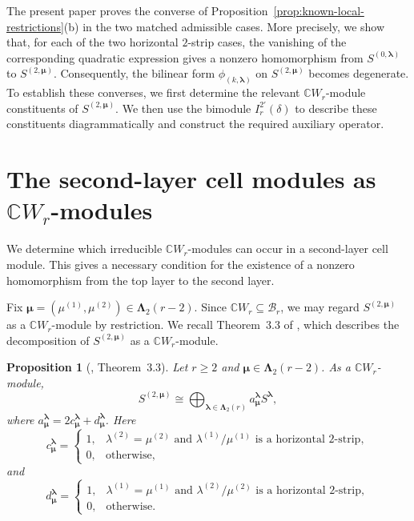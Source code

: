 \documentclass[10pt,a4paper]{amsart}
\newtheorem{proposition}[theorem]{Proposition}
\newcommand{\C}{\mathbb{C}}
\newcommand{\1}{\mathfrak{1}}
\newcommand{\B}{\mathcal{B}}
\begin{document}
The present paper proves the converse of Proposition~\ref{prop:known-local-restrictions}(b) in the two matched admissible cases. More precisely, we show that, for each of the two horizontal $2$-strip cases, the vanishing of the corresponding quadratic expression gives a nonzero homomorphism from $S^{(0,\bm\lambda)}$ to $S^{(2,\bm\mu)}$. Consequently, the bilinear form $\phi_{(k, \bm\lambda)}$ on $S^{(2,\bm\mu)}$ becomes degenerate. To establish these converses, we first determine the relevant $\C W_r$-module constituents of $S^{(2,\bm\mu)}$. We then use the bimodule $I_r^{2'}(\delta)$ to describe these
constituents diagrammatically and construct the required
auxiliary operator.

\section{The second-layer cell modules as $\C W_r$-modules}
\label{sec:second-layer-Wr}

We determine which irreducible $\C W_r$-modules can occur in a second-layer cell module. This gives a necessary condition for the existence of a nonzero homomorphism from the top layer to the second layer.

Fix $\bm\mu=(\mu^{(1)},\mu^{(2)})\in\bm\Lambda_2(r-2)$. Since
$\C W_r\subseteq\B_r$, we may regard $S^{(2,\bm\mu)}$ as a $\C W_r$-module by restriction. We recall Theorem~3.3 of \cite{KCTprevious}, which describes
the decomposition of $S^{(2,\bm\mu)}$ as a $\C W_r$-module.

\begin{proposition}[\cite{KCTprevious}, Theorem~3.3]
\label{prop:second-layer-Wr-decomposition}
Let $r\geq2$ and $\bm\mu\in\bm\Lambda_2(r-2)$. As a
$\C W_r$-module,
$$
S^{(2,\bm\mu)}
\cong\bigoplus_{\bm\lambda\in\bm\Lambda_2(r)}a_{\bm\mu}^{\bm\lambda}S^{\bm\lambda},
$$
where
$a_{\bm\mu}^{\bm\lambda}=2c_{\bm\mu}^{\bm\lambda}+d_{\bm\mu}^{\bm\lambda}$. Here
$$
c_{\bm\mu}^{\bm\lambda}=\begin{cases}
1, & \lambda^{(2)}=\mu^{(2)}
\text{ and } \lambda^{(1)}/\mu^{(1)}
\text{ is a horizontal $2$-strip},\\
0, & \text{otherwise},
\end{cases}
$$
and
$$
d_{\bm\mu}^{\bm\lambda} = \begin{cases}
1, & \lambda^{(1)}=\mu^{(1)}
\text{ and } \lambda^{(2)}/\mu^{(2)}
\text{ is a horizontal $2$-strip},\\
0, & \text{otherwise}.
\end{cases}
$$
\end{proposition}
\end{document}
